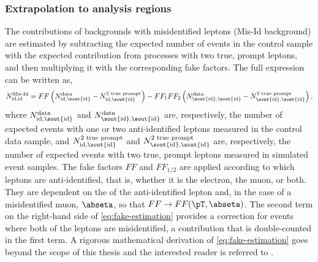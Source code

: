 \subsubsection{Extrapolation to analysis regions}
The contributions of backgrounds with misidentified leptons (Mis-Id background) are estimated by subtracting the  expected number of events in the control sample with the expected contribution from processes with two true, prompt leptons, and then multiplying it with the corresponding fake factors.
The full expression can be written as,
\begin{equation}
    \label{eq:fake-estimation}
    N_{\text{id,id}}^{\text{Mis-Id}} = FF \left( N_{\text{id,\sout{id}}}^{\text{data}} - N_{\text{id,\sout{id}}}^{\text{2 true prompt}} \right) - FF_1FF_2 \left( N_{\text{\sout{id},\sout{id}}}^{\text{data}} - N_{\text{\sout{id},\sout{id}}}^{\text{2 true prompt}} \right),
\end{equation}
where $N_{\text{id,\sout{id}}}^{\text{data}}$ and $N_{\text{\sout{id},\sout{id}}}^{\text{data}}$ are, respectively, the number of expected events with one or two anti-identified leptons measured in the control data sample, and $N_{\text{id,\sout{id}}}^{\text{2 true prompt}}$ and $N_{\text{\sout{id},\sout{id}}}^{\text{2 true prompt}}$ are, respectively, the number of expected events with two true, prompt leptons measured in simulated event samples. 
The fake factors $FF$ and $FF_{1/2}$ are applied according to which leptons are anti-identified, that is, whether it is the electron, the muon, or both. 
They are dependent on the \pT of the anti-identified lepton and, in the case of a misidentified muon, $\abseta$, so that $FF \to FF(\pT, \abseta)$.
The second term on the right-hand side of \cref{eq:fake-estimation} provides a correction for events where both of the leptons are misidentified, a contribution that is double-counted in the first term. A rigorous mathematical derivation of \cref{eq:fake-estimation} goes beyond the scope of this thesis and the interested reader is referred to .

